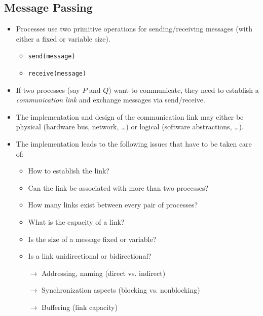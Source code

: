 \documentclass[a4paper, 11pt, accentcolor = tud3b]{tudreport}
\begin{document}
            \subsection{Message Passing}
                \begin{itemize}
                	\item Processes use two primitive operations for sending/receiving messages (with either a fixed or variable size).
		                \begin{itemize}
		                	\item \texttt{send(message)}
		                	\item \texttt{receive(message)}
		                \end{itemize}
	                \item If two processes (say \(P\) and \(Q\)) want to communicate, they need to establish a \textit{communication link} and exchange messages via send/receive.
	                \item The implementation and design of the communication link may either be physical (hardware bus, network, \dots) or logical (software abstractions, \dots).
	                \item The implementation leads to the following issues that have to be taken care of:
		                \begin{itemize}
		                	\item How to establish the link?
		                	\item Can the link be associated with more than two processes?
		                	\item How many links exist between every pair of processes?
		                	\item What is the capacity of a link?
		                	\item Is the size of a message fixed or variable?
		                	\item Is a link unidirectional or bidirectional?
		                	\item[\(\rightarrow\)] Addressing, naming (direct vs. indirect)
		                	\item[\(\rightarrow\)] Synchronization aspects (blocking vs. nonblocking)
		                	\item[\(\rightarrow\)] Buffering (link capacity)
		                \end{itemize}
                \end{itemize}
\end{document}
